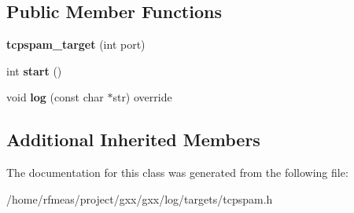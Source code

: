 \subsection*{Public Member Functions}
\begin{DoxyCompactItemize}
\item 
{\bfseries tcpspam\+\_\+target} (int port)\hypertarget{classgxx_1_1log_1_1tcpspam__target_a5b2aaa4f8fbcf549dd700e9a17a34a2a}{}\label{classgxx_1_1log_1_1tcpspam__target_a5b2aaa4f8fbcf549dd700e9a17a34a2a}

\item 
int {\bfseries start} ()\hypertarget{classgxx_1_1log_1_1tcpspam__target_a820ca56196086ae481ac5d5603a24555}{}\label{classgxx_1_1log_1_1tcpspam__target_a820ca56196086ae481ac5d5603a24555}

\item 
void {\bfseries log} (const char $\ast$str) override\hypertarget{classgxx_1_1log_1_1tcpspam__target_a47dd4f4c2fa80d90e7dcbadd8acdc9aa}{}\label{classgxx_1_1log_1_1tcpspam__target_a47dd4f4c2fa80d90e7dcbadd8acdc9aa}

\end{DoxyCompactItemize}
\subsection*{Additional Inherited Members}


The documentation for this class was generated from the following file\+:\begin{DoxyCompactItemize}
\item 
/home/rfmeas/project/gxx/gxx/log/targets/tcpspam.\+h\end{DoxyCompactItemize}
